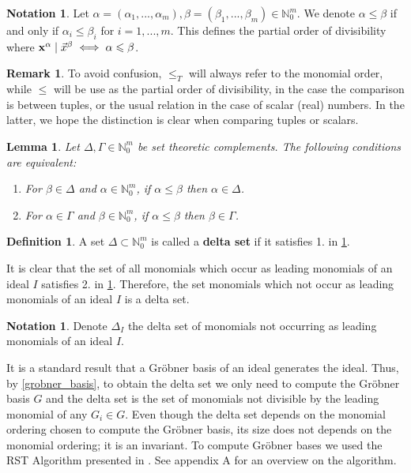 \documentclass[12pt]{article}
\renewcommand{\vec}[1]{\textup{\textbf{#1}}}
\newtheorem{lemma}[theorem]{Lemma}
\theoremstyle{definition}
\newtheorem{definition}[theorem]{Definition}
\theoremstyle{definition}
\newtheorem{notation}[theorem]{Notation}
\theoremstyle{definition}
\newtheorem{remark}[theorem]{Remark}
\theoremstyle{plain}
\theoremstyle{plain}
\numberwithin{equation}{section}
\begin{document}
\begin{notation}
    Let $\alpha = (\alpha_1, ..., \alpha_m), \beta = (\beta_1, ..., \beta_m) \in \mathbb{N}_0^m$. 
    We denote $\alpha \leqslant \beta$ if and only if $\alpha_i \leqslant \beta_i$ for $i = 1, ..., m$. 
    This defines the partial order of divisibility where $\vec{x}^{\alpha} \mid \Vec{x}^\beta \iff \alpha \leqslant \beta$.
\end{notation}


\begin{remark}
    To avoid confusion, $\leqslant_T$ will always refer to the monomial order, while $\leqslant$ will be use as the partial order of divisibility, in the case the comparison is between tuples, or the usual relation in the case of scalar (real) numbers. 
    In the latter, we hope the distinction is clear when comparing tuples or scalars.
\end{remark}


\begin{lemma}\label{def_deltaSet}
    Let $\Delta, \Gamma \in \mathbb{N}_0^m$ be set theoretic complements. 
    The following conditions are equivalent:
    \begin{enumerate}
        \item For $\beta\in\Delta$ and $\alpha \in \mathbb{N}_0^m$, if $\alpha \leqslant    \beta$ then $\alpha \in \Delta$.
        \item For $\alpha \in \Gamma$ and $\beta \in \mathbb{N}_0^m$, if $\alpha \leqslant \beta$ then $\beta \in \Gamma$.
    \end{enumerate}
\end{lemma}


\begin{definition}
    A set $\Delta \subset \mathbb{N}_0^m$ is called a \textbf{delta set} if it satisfies 1. in \cref{def_deltaSet}.
\end{definition}


It is clear that the set of all monomials which occur as leading monomials of an ideal $I$ satisfies 2. in \cref{def_deltaSet}. 
Therefore, the set monomials which not occur as leading monomials of an ideal $I$ is a delta set.


\begin{notation}
    Denote $\Delta_I$ the delta set of monomials not occurring as leading monomials of an ideal $I$.
\end{notation}


It is a standard result that a Gr\"obner basis of an ideal generates the ideal. 
Thus, by \cref{grobner_basis}, to obtain the delta set we only need to compute the Gr\"obner basis $G$ and the delta set is the set of monomials not divisible by the leading monomial of any $G_i \in G$. 
Even though the delta set depends on the monomial ordering chosen to compute the Gr\"obner basis, its size does not depends on the monomial ordering; it is an invariant. 
To compute Gr\"obner bases we used the RST Algorithm presented in \cite{rubio2016finding}.
See appendix A for an overview on the algorithm.
\end{document}
